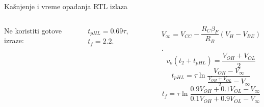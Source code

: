 \begin{frame}[label=10-s032]{Kašnjenje i vreme opadanja RTL izlaza}
\setlength{\abovedisplayskip}{4pt}\setlength{\belowdisplayskip}{4pt}\setlength{\abovedisplayshortskip}{3pt}\setlength{\belowdisplayshortskip}{3pt}
\begin{columns}[T,onlytextwidth]\par\medskip\raggedright
Ne koristiti gotove izraze:\par $t_{pHL}=0.69\tau$, $t_f=2.2$.\centering \raggedright
$V_\infty=V_{CC}-\dfrac{R_C\beta_F}{R_B}(V_H-V_{BE})$.
\[v_o(t_2+t_{pHL})=\frac{V_{OH}+V_{OL}}2\]
\[t_{pHL}=\tau\ln\frac{V_{OH}-V_\infty}{\frac{V_{OH}+V_{OL}}2-V_\infty}\]
\[t_f=\tau\ln\frac{0.9V_{OH}+0.1V_{OL}-V_\infty}{0.1V_{OH}+0.9V_{OL}-V_\infty}\]
\end{columns}
\end{frame}
